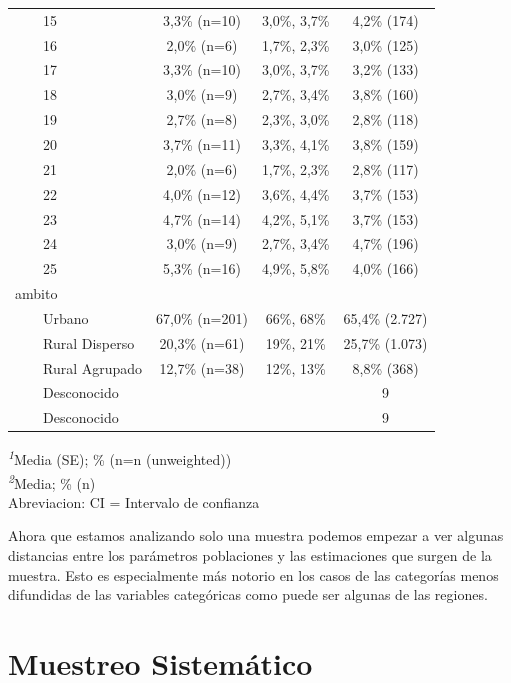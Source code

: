 \documentclass[
  spanish,
  a4paper,
]{scrreprt}
\begin{document}
\begin{table}
{\begin{tabular*}{\linewidth}{@{\extracolsep{\fill}}lccc}
    15 & 3,3\% (n=10) & 3,0\%, 3,7\% & 4,2\% (174) \\ 
    16 & 2,0\% (n=6) & 1,7\%, 2,3\% & 3,0\% (125) \\ 
    17 & 3,3\% (n=10) & 3,0\%, 3,7\% & 3,2\% (133) \\ 
    18 & 3,0\% (n=9) & 2,7\%, 3,4\% & 3,8\% (160) \\ 
    19 & 2,7\% (n=8) & 2,3\%, 3,0\% & 2,8\% (118) \\ 
    20 & 3,7\% (n=11) & 3,3\%, 4,1\% & 3,8\% (159) \\ 
    21 & 2,0\% (n=6) & 1,7\%, 2,3\% & 2,8\% (117) \\ 
    22 & 4,0\% (n=12) & 3,6\%, 4,4\% & 3,7\% (153) \\ 
    23 & 4,7\% (n=14) & 4,2\%, 5,1\% & 3,7\% (153) \\ 
    24 & 3,0\% (n=9) & 2,7\%, 3,4\% & 4,7\% (196) \\ 
    25 & 5,3\% (n=16) & 4,9\%, 5,8\% & 4,0\% (166) \\ 
ambito &  &  &  \\ 
    Urbano & 67,0\% (n=201) & 66\%, 68\% & 65,4\% (2.727) \\ 
    Rural Disperso & 20,3\% (n=61) & 19\%, 21\% & 25,7\% (1.073) \\ 
    Rural Agrupado & 12,7\% (n=38) & 12\%, 13\% & 8,8\% (368) \\ 
    Desconocido &  &  & 9 \\ 
    Desconocido &  &  & 9 \\ 
\bottomrule
\end{tabular*}
\begin{minipage}{\linewidth}
\textsuperscript{\textit{1}}Media (SE); \% (n=n (unweighted))\\
\textsuperscript{\textit{2}}Media; \% (n)\\
Abreviacion: CI = Intervalo de confianza\\
\end{minipage}

}

\end{table}%

Ahora que estamos analizando solo una muestra podemos empezar a ver
algunas distancias entre los parámetros poblaciones y las estimaciones
que surgen de la muestra. Esto es especialmente más notorio en los casos
de las categorías menos difundidas de las variables categóricas como
puede ser algunas de las regiones.

\section{Muestreo Sistemático}\label{muestreo-sistemuxe1tico}
\end{document}
